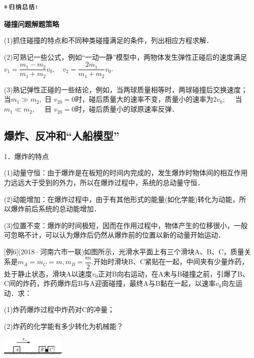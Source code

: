 \documentclass[cn,10.5pt,chinese,mac,chinesefont=founder]{elegantbook}
\begin{document}
\begin{center}\includegraphics[width=0.70764in,height=0.12292in]{media/image13.png}

\textbf{碰撞问题解题策略}
\end{center}


(1)抓住碰撞的特点和不同种类碰撞满足的条件，列出相应方程求解．

(2)可熟记一些公式，例如``一动一静''模型中，两物体发生弹性正碰后的速度满足$v_{1}=\dfrac{m_{1}-m_{2}}{m_{1}+m_{2}} v_{0}, \quad v_{2}=\dfrac{2 m_{1}}{m_{1}+m_{2}} v_{0}$.

(3)熟记弹性正碰的一些结论，例如，当两球质量相等时，两球碰撞后交换速度；当$m_{1} \gg m_{2},$ 日 $v_{20}=0$时，碰后质量大的速率不变，质量小的速率为$2 v_{0} ; \quad$ 当 $m_{1} \ll m_{2}, \quad$ 目 $v_{20}=0$时，碰后质量小的球原速率反弹．
\newpage
\subsection{爆炸、反冲和``人船模型''}

1．爆炸的特点

(1)动量守恒：由于爆炸是在板短的时间内完成的，发生爆炸时物体间的相互作用力远远大于受到的外力，所以在爆炸过程中，系统的总动量守恒．

(2)动能增加：在爆炸过程中，由于有其他形式的能量(如化学能)转化为动能，所以爆炸前后系统的总动能增加．

(3)位置不变：爆炸的时间极短，因而在作用过程中，物体产生的位移很小，一般可忽略不计，可以认为爆炸后仍然从爆炸前的位置以新的动量开始运动．

{[}例6{]}(2018·河南六市一联)如图所示，光滑水平面上有三个滑块A、B、C，质量关系是$m_{A}=m_{C}=m, m_{B}=\dfrac{m}{2}$.开始时滑块B、C紧贴在一起，中间夹有少量炸药，处于静止状态，滑块A以速度$v_0$正对B向右运动，在A未与B碰撞之前，引爆了B、C间的炸药，炸药爆炸后B与A迎面碰撞，最终A与B黏在一起，以速率$v_0$向左运动．求：

(1)炸药爆炸过程中炸药对C的冲量；

(2)炸药的化学能有多少转化为机械能？

\begin{center}\includegraphics[width=1.23611in,height=0.33958in]{media/image253.png}\end{center}
\end{document}
